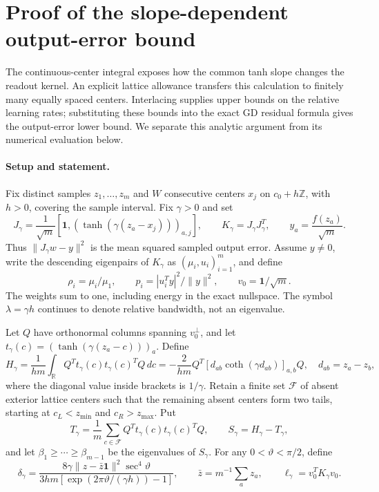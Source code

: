 \section{Proof of the slope-dependent output-error bound}
\label{app:slope-proof}

The continuous-center integral exposes how the common tanh slope changes the
readout kernel. An explicit lattice allowance transfers this calculation to
finitely many equally spaced centers. Interlacing supplies upper bounds on the
relative learning rates; substituting these bounds into the exact GD residual
formula gives the output-error lower bound. We separate this analytic argument
from its numerical evaluation below.

\paragraph{Setup and statement.}
Fix distinct samples $z_1,\ldots,z_m$ and $W$ consecutive centers $x_j$ on
$c_0+h\mathbb Z$, with $h>0$, covering the sample interval. Fix $\gamma>0$ and set
\begin{equation}
 J_\gamma=\frac1{\sqrt m}
 [\mathbf1,(\tanh(\gamma(z_a-x_j)))_{a,j}],\qquad
 K_\gamma=J_\gamma J_\gamma^T,\qquad y_a=\frac{f(z_a)}{\sqrt m}.
 \label{eq:app-slope-setup}
\end{equation}
Thus $\|J_\gamma w-y\|^2$ is the mean squared sampled output error. Assume
$y\ne0$, write the descending eigenpairs of $K_\gamma$ as $(\mu_i,u_i)_{i=1}^m$,
and define
\begin{equation}
 \rho_i=\mu_i/\mu_1,\qquad p_i=|u_i^Ty|^2/\|y\|^2,\qquad
 v_0=\mathbf1/\sqrt m.
\end{equation}
The weights sum to one, including energy in the exact nullspace. The symbol
$\lambda=\gamma h$ continues to denote relative bandwidth, not an eigenvalue.

Let $Q$ have orthonormal columns spanning $v_0^\perp$, and let
$t_\gamma(c)=(\tanh(\gamma(z_a-c)))_a$. Define
\begin{equation}
 H_\gamma=\frac1{hm}\int_{\mathbb R}
 Q^Tt_\gamma(c)t_\gamma(c)^TQ\,dc
 =-\frac2{hm}Q^T[d_{ab}\coth(\gamma d_{ab})]_{a,b}Q,
 \quad d_{ab}=z_a-z_b,
 \label{eq:app-slope-integral}
\end{equation}
where the diagonal value inside brackets is $1/\gamma$. Retain a finite set
$\mathcal F$ of absent exterior lattice centers such that the remaining absent
centers form two tails, starting at $c_L<z_{\min}$ and $c_R>z_{\max}$. Put
\begin{equation}
 T_\gamma=\frac1m\sum_{c\in\mathcal F}
 Q^Tt_\gamma(c)t_\gamma(c)^TQ,\qquad S_\gamma=H_\gamma-T_\gamma,
 \label{eq:app-slope-corrected}
\end{equation}
and let $\beta_1\ge\cdots\ge\beta_{m-1}$ be the eigenvalues of $S_\gamma$.
For any $0<\vartheta<\pi/2$, define
\begin{equation}
 \delta_\gamma=
 \frac{8\gamma\|z-\bar z\mathbf1\|^2\sec^4\vartheta}
 {3hm[\exp(2\pi\vartheta/(\gamma h))-1]},\qquad
 \bar z=m^{-1}\sum_a z_a,\qquad \ell_\gamma=v_0^TK_\gamma v_0.
 \label{eq:app-slope-lattice-allowance}
\end{equation}

